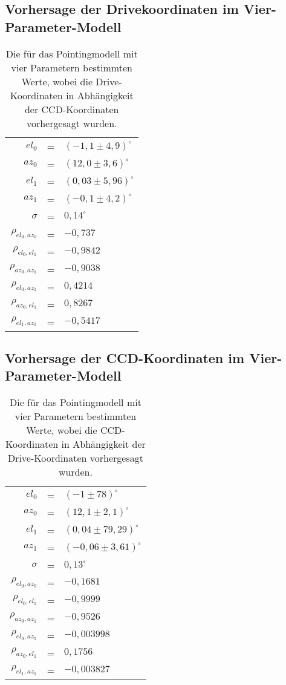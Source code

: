 \subsection*{Vorhersage der Drivekoordinaten im Vier-Parameter-Modell}
\begin{table}[htbp]
\centering
\begin{tabular}{rcl}
\toprule
$el_0$ &=& $(-1,1\pm 4,9)^{\circ}$\\
$az_0$ &=& $(12,0\pm3,6)^{\circ}$\\
$el_1$ &=& $(0,03\pm 5,96)^{\circ}$\\
$az_1$ &=& $(-0,1\pm4,2)^{\circ}$\\
$\sigma$ &=& $0,14^{\circ}$\\
$\rho_{el_0,az_0}$ &=& $-0,737$\\
$\rho_{el_0,el_1}$ &=& $-0,9842$\\
$\rho_{az_0,az_1}$ &=& $-0,9038$\\
$\rho_{el_0,az_1}$ &=& $0,4214$\\
$\rho_{az_0,el_1}$ &=& $0,8267$\\
$\rho_{el_1,az_1}$ &=& $-0,5417$\\
\bottomrule
\end{tabular}
\caption{Die für das Pointingmodell mit vier Parametern bestimmten Werte, wobei die Drive-Koordinaten in Abhängigkeit der CCD-Koordinaten vorhergesagt wurden.}
\label{tab:C2D4-}
\end{table}
\newpage
\subsection*{Vorhersage der CCD-Koordinaten im Vier-Parameter-Modell}
\begin{table}[htbp]
\centering
\begin{tabular}{rcl}
\toprule
$el_0$ &=& $(-1\pm 78)^{\circ}$\\
$az_0$ &=& $(12,1\pm2,1)^{\circ}$\\
$el_1$ &=& $(0,04\pm 79,29)^{\circ}$\\
$az_1$ &=& $(-0,06\pm3,61)^{\circ}$\\
$\sigma$ &=& $0,13^{\circ}$\\
$\rho_{el_0,az_0}$&=& $-0,1681$\\
$\rho_{el_0,el_1}$&=& $-0,9999$\\
$\rho_{az_0,az_1}$&=& $-0,9526$\\
$\rho_{el_0,az_1}$&=& $-0,003998$\\
$\rho_{az_0,el_1}$&=& $0,1756$\\
$\rho_{el_1,az_1}$&=& $-0,003827$\\
\bottomrule
\end{tabular}
\caption{Die für das Pointingmodell mit vier Parametern bestimmten Werte, wobei die CCD-Koordinaten in Abhängigkeit der Drive-Koordinaten vorhergesagt wurden.}
\label{tab:D2C4-}
\end{table}